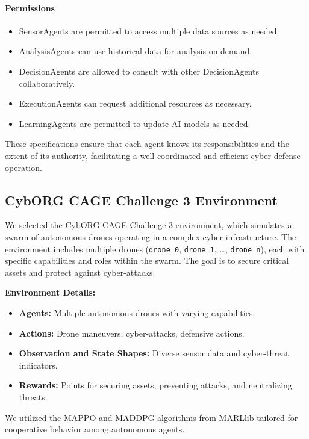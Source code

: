 \documentclass[conference]{IEEEtran}
\begin{document}
\paragraph*{Permissions}

\begin{itemize}
    \item SensorAgents are permitted to access multiple data sources as needed.
    \item AnalysisAgents can use historical data for analysis on demand.
    \item DecisionAgents are allowed to consult with other DecisionAgents collaboratively.
    \item ExecutionAgents can request additional resources as necessary.
    \item LearningAgents are permitted to update AI models as needed.
\end{itemize}

These specifications ensure that each agent knows its responsibilities and the extent of its authority, facilitating a well-coordinated and efficient cyber defense operation.



\subsection{CybORG CAGE Challenge 3 Environment}

We selected the CybORG CAGE Challenge 3 environment, which simulates a swarm of autonomous drones operating in a complex cyber-infrastructure. The environment includes multiple drones (\texttt{drone\_0}, \texttt{drone\_1}, \ldots, \texttt{drone\_n}), each with specific capabilities and roles within the swarm. The goal is to secure critical assets and protect against cyber-attacks.

\textbf{Environment Details:}
\begin{itemize}
    \item \textbf{Agents:} Multiple autonomous drones with varying capabilities.
    \item \textbf{Actions:} Drone maneuvers, cyber-attacks, defensive actions.
    \item \textbf{Observation and State Shapes:} Diverse sensor data and cyber-threat indicators.
    \item \textbf{Rewards:} Points for securing assets, preventing attacks, and neutralizing threats.
\end{itemize}

We utilized the MAPPO and MADDPG algorithms from MARLlib tailored for cooperative behavior among autonomous agents.
\end{document}
